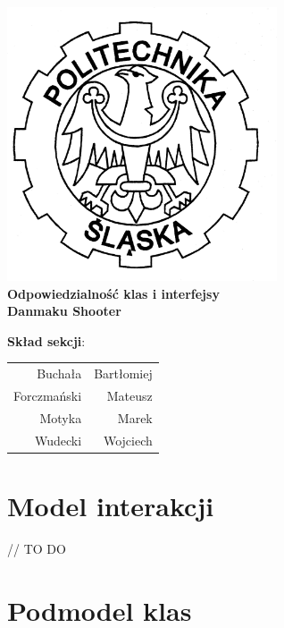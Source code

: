 \documentclass[a4paper,twoside]{article}
\begin{document}
\begin{titlepage}
	\centering
	\includegraphics[width=0.6\textwidth]{./images/logo.png}
	\\\vspace{10mm}
	\textbf{{\huge Odpowiedzialność klas i interfejsy}}\\\vspace{5mm}
	\textbf{{\Huge Danmaku Shooter}}
	\\
	\vfill
	\begin{flushright}
			{\Large \textbf{Skład sekcji}:}\\
		\begin{tabular}{rr}
			{\Large Buchała} & {\Large Bartłomiej}\\[-3pt]
			{\Large Forczmański} & {\Large Mateusz}\\[-3pt]
			{\Large Motyka} & {\Large Marek}\\[-3pt]
			{\Large Wudecki} & {\Large Wojciech}
		\end{tabular}
	\end{flushright}
	
\end{titlepage}

\part{\huge \textbf{Model interakcji}}

// TO DO


\newpage

\part{\huge \textbf{Podmodel klas}}
\end{document}

